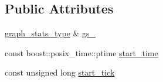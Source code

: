 \subsection*{Public Attributes}
\begin{DoxyCompactItemize}
\item 
\hyperlink{structecto_1_1profile_1_1graph__stats__type}{graph\-\_\-stats\-\_\-type} \& \hyperlink{structecto_1_1profile_1_1graphstats__collector_ad2a745e661114e28bd044844bf2b60fd}{gs\-\_\-}
\item 
const boost\-::posix\-\_\-time\-::ptime \hyperlink{structecto_1_1profile_1_1graphstats__collector_a85cb67d72c9d1072634b879776e2e4b8}{start\-\_\-time}
\item 
const unsigned long \hyperlink{structecto_1_1profile_1_1graphstats__collector_a7a840b075fd490da5107ea538614d017}{start\-\_\-tick}
\end{DoxyCompactItemize}


